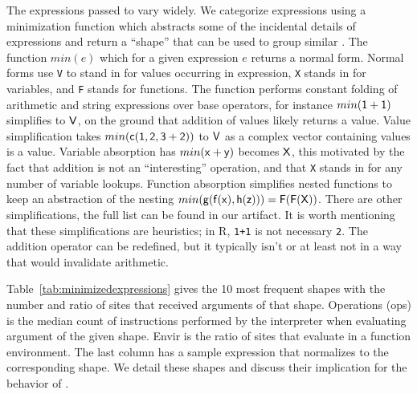 \documentclass[review,screen,acmsmall]{acmart}%
\renewcommand{\k}[1]{\lstinline |#1|\xspace}
\begin{document}
The expressions passed to \eval vary widely. We categorize expressions using a
minimization function which abstracts some of the incidental details of
expressions and return a ``shape'' that can be used to group similar \evals. The
function $min(e)$ which for a given expression $e$ returns a normal form. Normal
forms use \k{V} to stand in for values occurring in expression, \k{X} stands in
for variables, and \k{F} stands for functions. The function performs constant
folding of arithmetic and string expressions over base operators, for instance
$min({\sf 1+1})$ simplifies to ${\sf V}$, on the ground that addition of values
likely returns a value. Value simplification takes $min({\sf c(1,2,3+2)})$ to
${\sf V}$ as a complex vector containing values is a value. Variable absorption
has $min({\sf x+y})$ becomes ${\sf X}$, this motivated by the fact that addition is
not an ``interesting'' operation, and that \k{X} stands in for any number of
variable lookups. Function absorption simplifies nested functions to keep an
abstraction of the nesting $min({\sf g(f(x),h(z))})={\sf F(F(X))}$. There are other
simplifications, the full list can be found in our artifact. It is worth
mentioning that these simplifications are heuristics; in R, \k{1+1} is not
necessary \k{2}. The addition operator can be redefined, but it typically isn't
or at least not in a way that would invalidate arithmetic.

Table~\ref{tab:minimizedexpressions} gives the 10 most frequent shapes with the
number and ratio of sites that received arguments of that shape. Operations (ops) is
the median count of instructions performed by the interpreter when evaluating
argument of the given shape. Envir is the ratio of sites that evaluate in a
function environment. The last column has a sample expression that normalizes to
the corresponding shape. We detail these shapes and discuss their implication for
the behavior of \eval.

\newcommand{\EE}[1]{{{\emph{\framebox{#1}}}}\\[1mm]}
\end{document}

